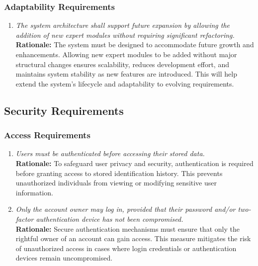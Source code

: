 \documentclass[]{article}
\begin{document}
\subsubsection{Adaptability Requirements}
\label{ssub:adaptability_requirements}
\begin{enumerate}[{MS-A}1. ]
	\item \textit{The system architecture shall support future expansion by allowing the addition of new expert modules without requiring significant refactoring.}
	\\ \textbf{Rationale:} The system must be designed to accommodate future growth and enhancements. Allowing new expert modules to be added without major structural changes ensures scalability, reduces development effort, and maintains system stability as new features are introduced. This will help extend the system’s lifecycle and adaptability to evolving requirements.
\end{enumerate}


\subsection{Security Requirements}
\label{sub:security_requirements}

\subsubsection{Access Requirements}
\label{ssub:access_requirements}
\begin{enumerate}[{SR-AC}1. ]
	\item \textit{Users must be authenticated before accessing their stored data.}
	\\ \textbf{Rationale:} To safeguard user privacy and security, authentication is required before granting access to stored identification history. This prevents unauthorized individuals from viewing or modifying sensitive user information.

	\item \textit{Only the account owner may log in, provided that their password and/or two-factor authentication device has not been compromised.}
	\\ \textbf{Rationale:} Secure authentication mechanisms must ensure that only the rightful owner of an account can gain access. This measure mitigates the risk of unauthorized access in cases where login credentials or authentication devices remain uncompromised.
\end{enumerate}
\end{document}
